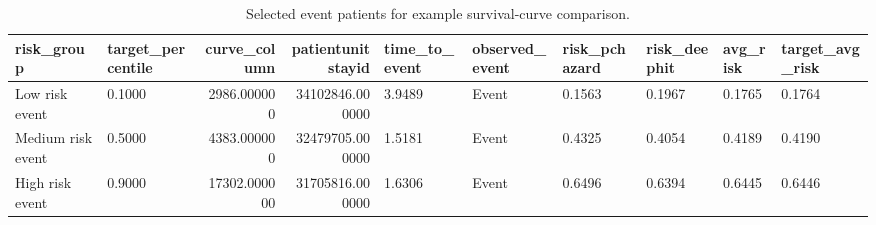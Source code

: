 \begin{table}
\caption{Selected event patients for example survival-curve comparison.}
\label{tab:example_event_survival_curve_patients}
\begin{tabular}{llrrllllll}
\toprule
risk_group & target_percentile & curve_column & patientunitstayid & time_to_event & observed_event & risk_pchazard & risk_deephit & avg_risk & target_avg_risk \\
\midrule
Low risk event & 0.1000 & 2986.000000 & 34102846.000000 & 3.9489 & Event & 0.1563 & 0.1967 & 0.1765 & 0.1764 \\
Medium risk event & 0.5000 & 4383.000000 & 32479705.000000 & 1.5181 & Event & 0.4325 & 0.4054 & 0.4189 & 0.4190 \\
High risk event & 0.9000 & 17302.000000 & 31705816.000000 & 1.6306 & Event & 0.6496 & 0.6394 & 0.6445 & 0.6446 \\
\bottomrule
\end{tabular}
\end{table}
